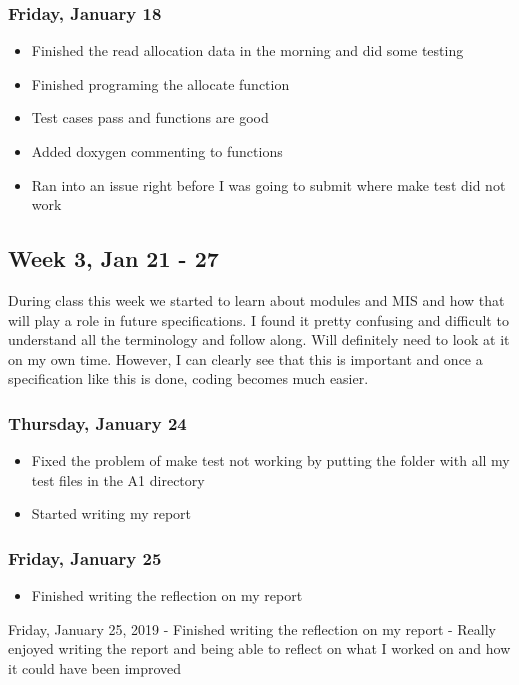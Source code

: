\documentclass{article}
\begin{document}
\subsubsection{Friday, January 18}
\begin{itemize}
    \item Finished the read allocation data in the morning and did some testing
    \item Finished programing the allocate function
    \item Test cases pass and functions are good
    \item Added doxygen commenting to functions
    \item Ran into an issue right before I was going to submit where make test did not work
\end{itemize}

\subsection{Week 3, Jan 21 - 27}

During class this week we started to learn about modules and MIS and how that will play a role in future specifications. I found it pretty confusing and difficult to understand all the terminology and follow along. Will definitely need to look at it on my own time. However, I can clearly see that this is important and once a specification like this is done, coding becomes much easier.

\subsubsection{Thursday, January 24}
\begin{itemize}
    \item Fixed the problem of make test not working by putting the folder with all my test files in the A1 directory
    \item Started writing my report
\end{itemize}

\subsubsection{Friday, January 25}
\begin{itemize}
    \item Finished writing the reflection on my report
\end{itemize}

Friday, January 25, 2019
	- Finished writing the reflection on my report
	- Really enjoyed writing the report and being able to reflect on what I worked on and how it could have been improved
\end{document}
